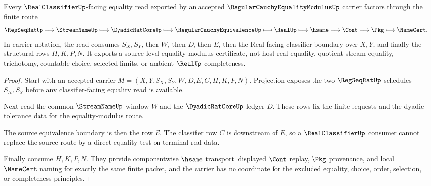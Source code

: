 \begin{theorem}
\label{thm:regular-cauchy-equality-modulus-classifier-route}
Every $\RealClassifierUp$-facing equality read exported by an accepted $\RegularCauchyEqualityModulusUp$ carrier factors through the finite route
$$
\RegSeqRatUp \longmapsto \StreamNameUp \longmapsto \DyadicRatCoreUp \longmapsto \RegularCauchyEquivalenceUp \longmapsto \RealUp \longmapsto \hsame \longmapsto \Cont \longmapsto \Pkg \longmapsto \NameCert .
$$
In carrier notation, the read consumes $S_X,S_Y$, then $W$, then $D$, then $E$, then the Real-facing classifier boundary over $X,Y$, and finally the structural rows $H,K,P,N$. It exports a source-level equality-modulus certificate, not host real equality, quotient stream equality, trichotomy, countable choice, selected limits, or ambient $\RealUp$ completeness.
\end{theorem}
\begin{proof}
Start with an accepted carrier $M=(X,Y,S_X,S_Y,W,D,E,C,H,K,P,N)$. Projection exposes the two $\RegSeqRatUp$ schedules $S_X,S_Y$ before any classifier-facing equality read is available.

Next read the common $\StreamNameUp$ window $W$ and the $\DyadicRatCoreUp$ ledger $D$. These rows fix the finite requests and the dyadic tolerance data for the equality-modulus route.

The source equivalence boundary is then the row $E$. The classifier row $C$ is downstream of $E$, so a $\RealClassifierUp$ consumer cannot replace the source route by a direct equality test on terminal real data.

Finally consume $H,K,P,N$. They provide componentwise $\hsame$ transport, displayed $\Cont$ replay, $\Pkg$ provenance, and local $\NameCert$ naming for exactly the same finite packet, and the carrier has no coordinate for the excluded equality, choice, order, selection, or completeness principles.
\end{proof}


